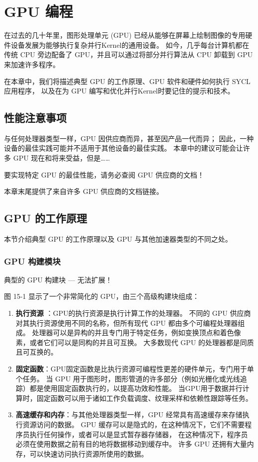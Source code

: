 \section{GPU 编程}
在过去的几十年里，图形处理单元 (GPU) 已经从能够在屏幕上绘制图像的专用硬件设备发展为能够执行复杂并行Kernel的通用设备。 
如今，几乎每台计算机都在传统 CPU 旁边配备了 GPU，并且可以通过将部分并行算法从 CPU 卸载到 GPU 来加速许多程序。

在本章中，我们将描述典型 GPU 的工作原理、GPU 软件和硬件如何执行 SYCL 应用程序，
以及在为 GPU 编写和优化并行Kernel时要记住的提示和技术。

\subsection{性能注意事项}
与任何处理器类型一样，GPU 因供应商而异，甚至因产品一代而异； 
因此，一种设备的最佳实践可能并不适用于其他设备的最佳实践。 
本章中的建议可能会让许多 GPU 现在和将来受益，但是……

\begin{remark}
	要实现特定 GPU 的最佳性能，请务必查阅 GPU 供应商的文档！
\end{remark}

本章末尾提供了来自许多 GPU 供应商的文档链接。

\subsection{GPU 的工作原理}
本节介绍典型 GPU 的工作原理以及 GPU 与其他加速器类型的不同之处。

\subsubsection{GPU 构建模块}
{\color{red} 典型的 GPU 构建块 — 无法扩展！}

图 15-1 显示了一个非常简化的 GPU，由三个高级构建块组成：

\begin{enumerate}
	\item \textbf{执行资源} ：GPU的执行资源是执行计算工作的处理器。 
不同的 GPU 供应商对其执行资源使用不同的名称，但所有现代 GPU 都由多个可编程处理器组成。 
处理器可以是异构的并且专门用于特定任务，例如变换顶点和着色像素，或者它们可以是同构的并且可互换。 
大多数现代 GPU 的处理器都是同质且可互换的。

	\item \textbf{固定函数}：GPU固定函数是比执行资源可编程性更差的硬件单元，专门用于单个任务。 
当 GPU 用于图形时，图形管道的许多部分（例如光栅化或光线追踪）都是使用固定函数执行的，以提高功效和性能。 
当GPU用于数据并行计算时，固定函数可以用于诸如工作负载调度、纹理采样和依赖性跟踪等任务。

	\item \textbf{高速缓存和内存}：与其他处理器类型一样，GPU 经常具有高速缓存来存储执行资源访问的数据。 
GPU 缓存可以是隐式的，在这种情况下，它们不需要程序员执行任何操作，或者可以是显式暂存器存储器，
在这种情况下，程序员必须在使用数据之前有目的地将数据移动到缓存中。 
许多 GPU 还拥有大量内存，可以快速访问执行资源所使用的数据。
\end{enumerate}

